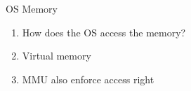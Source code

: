 \documentclass{beamer}
\begin{document}
\begin{frame}{OS Memory}
  \begin{enumerate}
  \item<1-> How does the OS access the memory?
  \item<2-> Virtual memory
  \item<7-> MMU also enforce access right
\end{enumerate}
\end{frame}
\end{document}
